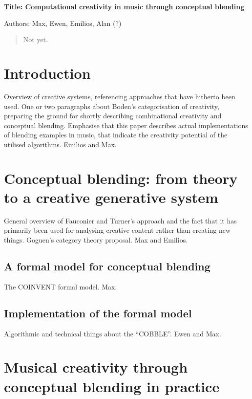 \documentclass[10pt,twoside,a4paper]{article}
\newcommand\comment[1]{{\color{red}#1}}
\begin{document}
\begin{center}\Large\bf
Title: Computational creativity in music through conceptual blending

Authors: Max, Ewen, Emilios, Alan (?)
\end{center}

\begin{abstract}
	Not yet.
\end{abstract}

\section{Introduction}\label{sec:introduction}

Overview of creative systems, referencing approaches that have hitherto been used. One or two paragraphs about Boden's categorisation of creativity, preparing the ground for shortly describing combinational creativity and conceptual blending. Emphasise that this paper describes actual implementations of blending examples in music, that indicate the creativity potential of the utilised algorithms. \comment{Emilios and Max.}

\section{Conceptual blending: from theory to a creative generative system}

General overview of Fauconier and Turner's approach and the fact that it has primarily been used for analysing creative content rather than creating new things. Goguen's category theory proposal. \comment{Max and Emilios.}

\subsection{A formal model for conceptual blending}

The COINVENT formal model. \comment{Max.}

\subsection{Implementation of the formal model}

Algorithmic and technical things about the ``COBBLE''. \comment{Ewen and Max.}


\section{Musical creativity through conceptual blending in practice}
\end{document}
